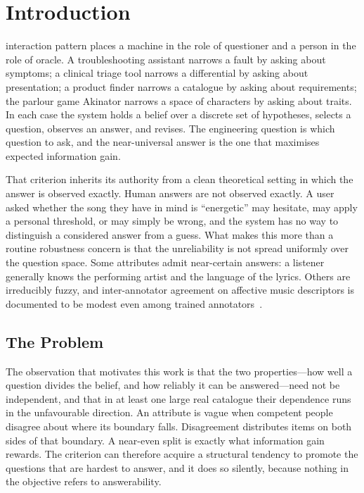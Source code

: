 \section{Introduction}
\label{sec:intro}

 interaction pattern places a machine in the role of
questioner and a person in the role of oracle. A troubleshooting assistant
narrows a fault by asking about symptoms; a clinical triage tool narrows a
differential by asking about presentation; a product finder narrows a
catalogue by asking about requirements; the parlour game Akinator narrows a
space of characters by asking about traits. In each case the system holds a
belief over a discrete set of hypotheses, selects a question, observes an
answer, and revises. The engineering question is which question to ask, and
the near-universal answer is the one that maximises expected information gain.

That criterion inherits its authority from a clean theoretical setting in
which the answer is observed exactly. Human answers are not observed exactly.
A user asked whether the song they have in mind is ``energetic'' may hesitate,
may apply a personal threshold, or may simply be wrong, and the system has no
way to distinguish a considered answer from a guess. What makes this more than
a routine robustness concern is that the unreliability is not spread uniformly
over the question space. Some attributes admit near-certain answers: a
listener generally knows the performing artist and the language of the lyrics.
Others are irreducibly fuzzy, and inter-annotator agreement on affective music
descriptors is documented to be modest even among trained
annotators~\cite{hu2007mood,kim2010emotion}.

\subsection{The Problem}

The observation that motivates this work is that the two properties---how well
a question divides the belief, and how reliably it can be answered---need not
be independent, and that in at least one large real catalogue their dependence
runs in the unfavourable direction. An attribute is vague when competent
people disagree about where its boundary falls. Disagreement distributes items
on both sides of that boundary. A near-even split is exactly what information
gain rewards. The criterion can therefore acquire a structural tendency to
promote the questions that are hardest to answer, and it does so silently,
because nothing in the objective refers to answerability.

